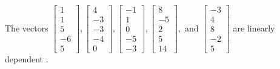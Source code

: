 \begin{exercise}
\begin{exerciseStatement}
  \end{exerciseStatement}
  \begin{exerciseAnswer}
   The vectors \(\left[\begin{array}{r}
1 \\
1 \\
5 \\
-6 \\
5
\end{array}\right] , \left[\begin{array}{r}
4 \\
-3 \\
-3 \\
-4 \\
0
\end{array}\right] , \left[\begin{array}{r}
-1 \\
1 \\
0 \\
-5 \\
-3
\end{array}\right] , \left[\begin{array}{r}
8 \\
-5 \\
2 \\
5 \\
14
\end{array}\right] , \text{ and } \left[\begin{array}{r}
-3 \\
4 \\
8 \\
-2 \\
5
\end{array}\right]\) are 
  	 linearly dependent  .
  


  \end{exerciseAnswer}
\end{exercise}